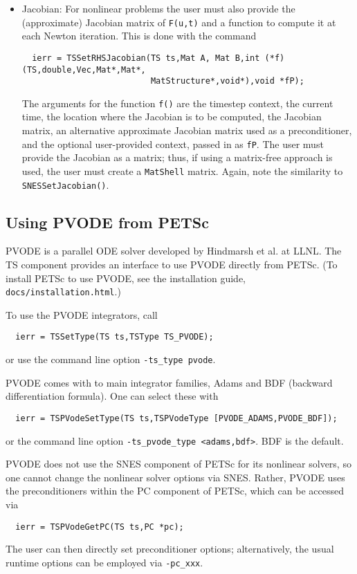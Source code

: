 \begin{itemize}
\item Jacobian: For nonlinear problems the user must also provide the 
(approximate) Jacobian matrix of {\tt F(u,t)} and a function to
compute it at each Newton iteration. This is done with the command
\begin{verbatim}
  ierr = TSSetRHSJacobian(TS ts,Mat A, Mat B,int (*f)(TS,double,Vec,Mat*,Mat*,
                          MatStructure*,void*),void *fP);
\end{verbatim}
The  arguments for the function {\tt f()} are
the timestep context, the current time, the location where the
Jacobian is to be computed, the Jacobian matrix, an alternative
approximate Jacobian matrix used as a preconditioner, and the optional
user-provided context, passed in as {\tt fP}. The user must provide the 
Jacobian as a matrix; thus, if using a matrix-free approach is used, the
user must create a {\tt MatShell} matrix. Again, note the similarity
to {\tt SNESSetJacobian()}. 
\end{itemize}

\subsection{Using PVODE from PETSc}

PVODE is a parallel ODE solver developed by Hindmarsh et al. at LLNL.
The TS component provides an interface to use PVODE directly from PETSc.
(To install PETSc to use PVODE, see the installation guide, {\tt docs/installation.html}.) 

To use the PVODE integrators, call 
\begin{verbatim}
  ierr = TSSetType(TS ts,TSType TS_PVODE);
\end{verbatim}
or use the command line option {\tt -ts\_type pvode}.  
  

PVODE comes with to main integrator families, Adams and BDF (backward 
differentiation formula). One can select these with 
\begin{verbatim}
  ierr = TSPVodeSetType(TS ts,TSPVodeType [PVODE_ADAMS,PVODE_BDF]);
\end{verbatim}
or the command line option {\tt -ts\_pvode\_type <adams,bdf>}. BDF is
the default.  
  

PVODE does not use the SNES component of PETSc for its nonlinear
solvers, so one cannot change the nonlinear solver options via
SNES. Rather, PVODE uses the preconditioners within the PC component
of PETSc, which can be accessed via
\begin{verbatim}
  ierr = TSPVodeGetPC(TS ts,PC *pc);
\end{verbatim}
The user can then directly set preconditioner options; 
alternatively, the usual runtime options can be employed
via {\tt -pc\_xxx}. 

